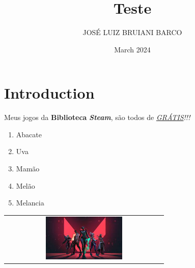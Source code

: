 \documentclass[a4paper, 12pt]{article}
\title{Teste}
\author{JOSÉ LUIZ BRUIANI BARCO}
\date{March 2024}
\begin{document}
\maketitle

\section{Introduction}
Meus jogos da \textbf{Biblioteca} \textit{\textbf{Steam}}, são todos de \textit{\uline{GRÁTIS}!!!} \par
\begin{enumerate}[\hspace{0.5cm}1)]
    \item Abacate
    \item Uva
    \item Mamão
    \item Melão
    \item Melancia
\end{enumerate}

\begin{figure}[H]
    \centering
\end{figure}
\begin{tabular}{c}
\includegraphics[width=0.5\textwidth]
{download.jpg}
\end{tabular}

\flushright{\textcolor{blue}{March, 18 of 2024}}
\end{document}
